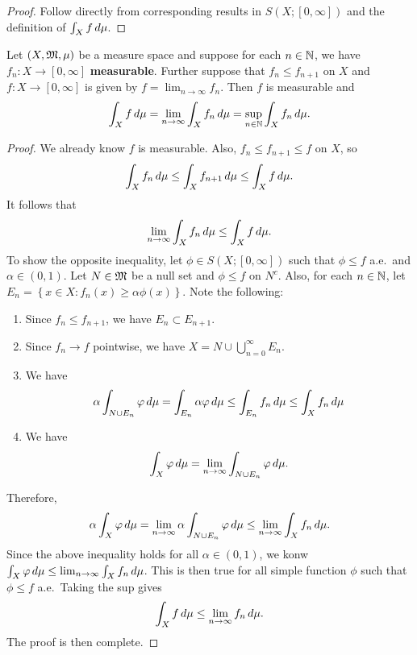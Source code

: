 \documentclass[a4paper]{article}
\renewcommand{\cupinfn}{\bigcup_{n=0}^\infty}
\begin{document}
\begin{proof}
  Follow directly from corresponding results in $S(X; [0, \infty])$ and
  the definition of $\int_X f \, d \mu$.
\end{proof}

\begin{thm}
  Let $(X, \mathfrak{M}, \mu)$ be a measure space and suppose for
  each $n \in \mathbb{N}$, we have $f_n :
    X \to [0, \infty]$ \textbf{measurable}. Further suppose
  that $f_n \leq f_{n+1}$ on $X$ and $f: X \to [0, \infty]$
  is given by $f = \lim_{n \to \infty} f_n$. Then
  $f$ is measurable and
  \[
    \int_X f \, d \mu = \lim_{n \to \infty} \int_X f_n \, d \mu
    = \sup_{n \in \mathbb{N}} \int_X f_n \, d \mu.
  \]
\end{thm}

\begin{proof}
  We already know $f$ is measurable. Also, $f_n \leq f_{n+1} \leq f$ on
  $X$, so
  \[
    \int_X f_n \, d \mu \leq \int_X f_{n+1} \, d \mu \leq
    \int_X f \, d \mu.
  \]
  It follows that
  \[
    \lim_{n \to \infty} \int_X f_n \, d \mu \leq \int_X f \, d \mu.
  \]
  To show the opposite inequality, let $\phi \in S(X; [0, \infty])$ such
  that $\phi \leq f$ a.e.\ and $\alpha \in (0, 1)$. Let $N \in \mathfrak{M}$ be a
  null set and $\phi \leq f$ on $N^c$. Also, for each $n \in \mathbb{N}$, let $E_n
  = \left\{ x \in X : f_n(x) \geq \alpha \phi(x) \right\}$. Note the
  following:
  \begin{enumerate}
    \item Since $f_n \leq f_{n+1}$, we have $E_n \subset E_{n+1}$.
    \item Since $f_n \to f$ pointwise, we have $X = N \cup \cupinfn E_n$.
    \item We have
          \[
            \alpha \int_{N \cup E_n} \varphi \, d \mu
            = \int_{E_n} \alpha \varphi \, d \mu
            \leq \int_{E_n} f_n \, d \mu
            \leq \int_X f_n \, d \mu
          \]
    \item We have
          \[
            \int_X \varphi \, d \mu
            = \lim_{n \to \infty} \int_{N \cup E_n} \varphi \, d \mu.
          \]
  \end{enumerate}
  Therefore,
  \[
    \alpha \int_X \varphi \, d \mu
    = \lim_{n \to \infty} \alpha \int_{N \cup E_n} \varphi \, d \mu
    \leq \lim_{n \to \infty} \int_X f_n \, d \mu.
  \]
  Since the above inequality holds for all $\alpha \in (0, 1)$, we konw
  $\int_X \varphi \, d \mu \leq \lim_{n \to \infty} \int_X f_n \, d \mu$. This is
  then true for all simple function $\phi$ such that $\phi \leq f$ a.e.\
  Taking the sup gives
  \[
    \int_X f \, d \mu \leq \lim_{n \to \infty} f_n \, d \mu.
  \]
  The proof is then complete.
\end{proof}
\end{document}
